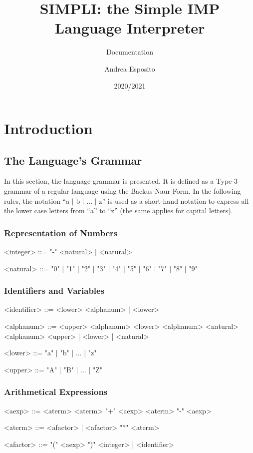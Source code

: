 \documentclass{esposito-documentation}
\title{SIMPLI: the Simple IMP Language Interpreter}
\subtitle{Documentation}
\author{Andrea Esposito}
\date{2020/2021}
\begin{document}
\frontmatter
\maketitle
\colophon
\tableofcontents

\mainmatter
\chapter{Introduction}

\section{The Language's Grammar}

In this section, the language grammar is presented. It is defined as a Type-3
grammar of a regular language using the Backus-Naur Form. In the following
rules, the notation ``a $\mid$ b $\mid$ ... $\mid$ z'' is used as a short-hand
notation to express all the lower case letters from ``a'' to ``z'' (the same
applies for capital letters).

\subsection{Representation of Numbers}
\begin{grammar}
	<integer> ::= "-" <natural> | <natural>

	<natural> ::= "0" | "1" | "2" | "3" | "4" | "5" | "6" | "7" | "8" | "9"
\end{grammar}

\subsection{Identifiers and Variables}
\begin{grammar}
	<identifier> ::= <lower> <alphanum> | <lower> 
	
	<alphanum> ::= <upper> <alphanum>
	\alt <lower> <alphanum>
	\alt <natural> <alphanum>
	\alt<upper> | <lower> | <natural>

	<lower> ::= "a" | "b" | ... | "z"

	<upper> ::= "A" | "B" | ... | "Z"
\end{grammar}

\subsection{Arithmetical Expressions}
\begin{grammar}
	<aexp> ::= <aterm>
	\alt <aterm> "+" <aexp>
	\alt <aterm> "-" <aexp>

	<aterm> ::= <afactor> | <afactor> "*" <aterm>

	<afactor> ::= "(" <aexp> ")"
	\alt <integer> | <identifier>
\end{grammar}
\end{document}
